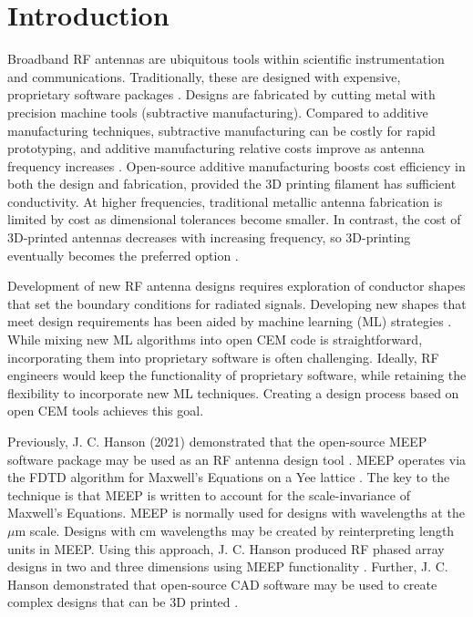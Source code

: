 \documentclass[electronics,article,submit,pdftex,moreauthors]{Definitions/mdpi}
\begin{document}
\section{Introduction}

Broadband RF antennas are ubiquitous tools within scientific instrumentation and communications.  Traditionally, these are designed with expensive, proprietary software packages \cite{hfss,xfdtd}.  Designs are fabricated by cutting metal with precision machine tools (subtractive manufacturing).  Compared to additive manufacturing techniques, subtractive manufacturing can be costly for rapid prototyping, and additive manufacturing relative costs improve as antenna frequency increases  \cite{segoviaguerrero2025additive-29b,alkaraki2025lowcost-d32}.  Open-source additive manufacturing boosts cost efficiency in both the design and fabrication, provided the 3D printing filament has sufficient conductivity.  At higher frequencies, traditional metallic antenna fabrication is limited by cost as dimensional tolerances become smaller. In contrast, the cost of 3D-printed antennas decreases with increasing frequency, so 3D-printing eventually becomes the preferred option \cite{alkaraki2020mmwave-bcd}.

Development of new RF antenna designs requires exploration of conductor shapes that set the boundary conditions for radiated signals.  Developing new shapes that meet design requirements has been aided by machine learning (ML) strategies \cite{gajbhiye2025comprehensive-fdb,goudos2016evolutionary-cc7,linden1999evolving-8c2}.  While mixing new ML algorithms into open CEM code is straightforward, incorporating them into proprietary software is often challenging.  Ideally, RF engineers would keep the  functionality of proprietary software, while retaining the flexibility to incorporate new ML techniques.  Creating a design process based on open CEM tools achieves this goal.

Previously, J. C. Hanson (2021) demonstrated that the open-source MEEP software package may be used as an RF antenna design tool \cite{hanson2021broadband-cab}.  MEEP operates via the FDTD algorithm for Maxwell's Equations on a Yee lattice \cite{10.1016/j.cpc.2009.11.008}.  The key to the technique is that MEEP is written to account for the scale-invariance of Maxwell's Equations.  MEEP is normally used for designs with wavelengths at the $\mu$m scale.  Designs with cm wavelengths may be created by reinterpreting length units in MEEP.  Using this approach, J. C. Hanson produced RF phased array designs in two and three dimensions using MEEP functionality \cite{hanson2021broadband-cab}.  Further, J. C. Hanson demonstrated that open-source CAD software may be used to create complex designs that can be 3D printed \cite{Hanson2022MeepCon}.
\end{document}
